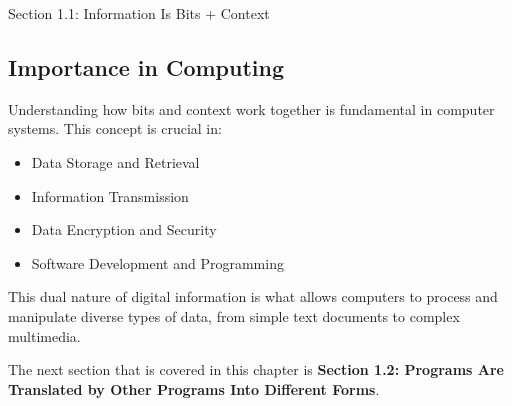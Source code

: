 \begin{notes}{Section 1.1: Information Is Bits + Context}
    \subsection*{Importance in Computing}

    Understanding how bits and context work together is fundamental in computer systems. This concept is crucial in:

    \begin{itemize}
        \item Data Storage and Retrieval
        \item Information Transmission
        \item Data Encryption and Security
        \item Software Development and Programming
    \end{itemize}

    This dual nature of digital information is what allows computers to process and manipulate diverse types of data, from simple text documents to complex multimedia.
\end{notes}

The next section that is covered in this chapter is \textbf{Section 1.2: Programs Are Translated by Other Programs Into Different Forms}.

